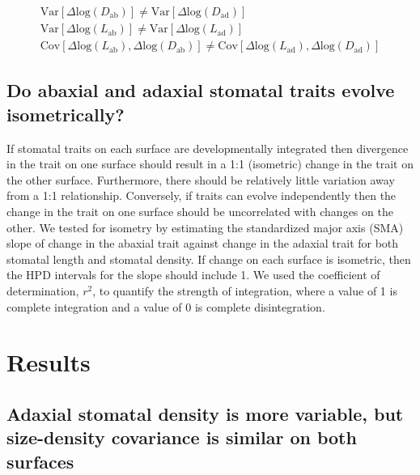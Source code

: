 \documentclass[
  10pt,
]{article}
\begin{document}
\begin{gather}\label{eq:prediction1}
\text{Var}[\Delta \text{log}(D_\text{ab})] \ne \text{Var}[\Delta \text{log}(D_\text{ad})] \\
\text{Var}[\Delta \text{log}(L_\text{ab})] \ne \text{Var}[\Delta \text{log}(L_\text{ad})] \\
\text{Cov}[\Delta \text{log}(L_\text{ab}), \Delta \text{log}(D_\text{ab})] \ne \text{Cov}[\Delta \text{log}(L_\text{ad}), \Delta \text{log}(D_\text{ad})]
\end{gather}

\hypertarget{do-abaxial-and-adaxial-stomatal-traits-evolve-isometrically}{%
\subsection{Do abaxial and adaxial stomatal traits evolve isometrically?}\label{do-abaxial-and-adaxial-stomatal-traits-evolve-isometrically}}

If stomatal traits on each surface are developmentally integrated then divergence in the trait on one surface should result in a 1:1 (isometric) change in the trait on the other surface. Furthermore, there should be relatively little variation away from a 1:1 relationship. Conversely, if traits can evolve independently then the change in the trait on one surface should be uncorrelated with changes on the other. We tested for isometry by estimating the standardized major axis (SMA) slope of change in the abaxial trait against change in the adaxial trait for both stomatal length and stomatal density. If change on each surface is isometric, then the HPD intervals for the slope should include 1. We used the coefficient of determination, \(r^2\), to quantify the strength of integration, where a value of 1 is complete integration and a value of 0 is complete disintegration.

\hypertarget{results}{%
\section{Results}\label{results}}

\hypertarget{adaxial-stomatal-density-is-more-variable-but-size-density-covariance-is-similar-on-both-surfaces}{%
\subsection{Adaxial stomatal density is more variable, but size-density covariance is similar on both surfaces}\label{adaxial-stomatal-density-is-more-variable-but-size-density-covariance-is-similar-on-both-surfaces}}
\end{document}
